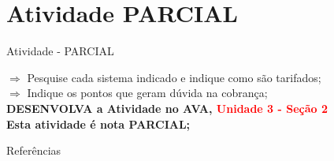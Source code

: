 \documentclass{beamer}
\begin{document}
\section{Atividade PARCIAL}
\begin{frame}{Atividade - PARCIAL}
    
    $\Rightarrow$ Pesquise cada sistema indicado e indique como são tarifados;\\
    \vspace{0.5cm}
    $\Rightarrow$ Indique os pontos que geram dúvida na cobrança;\\
    \vspace{0.9cm}
     \textbf{DESENVOLVA a Atividade no AVA, \textcolor{red}{Unidade 3 - Seção 2}\\
Esta atividade é nota PARCIAL;}
    
\end{frame}
\begin{frame}{Referências}%
 \tiny
 \begin{center}
 	
	 
 \end{center}
 \end{frame}
\end{document}
